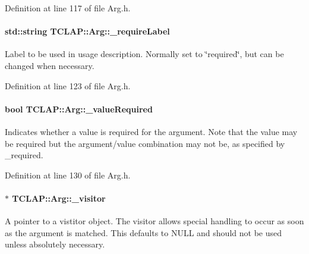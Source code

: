 Definition at line 117 of file Arg.\+h.

\paragraph[{\texorpdfstring{\+\_\+require\+Label}{_requireLabel}}]{\setlength{\rightskip}{0pt plus 5cm}std\+::string T\+C\+L\+A\+P\+::\+Arg\+::\+\_\+require\+Label\hspace{0.3cm}{\ttfamily [protected]}}\hypertarget{classTCLAP_1_1Arg_a2ed097a868e34a0c4f6062ead744ac54}{}\label{classTCLAP_1_1Arg_a2ed097a868e34a0c4f6062ead744ac54}
Label to be used in usage description. Normally set to \char`\"{}required\char`\"{}, but can be changed when necessary. 

Definition at line 123 of file Arg.\+h.

\paragraph[{\texorpdfstring{\+\_\+value\+Required}{_valueRequired}}]{\setlength{\rightskip}{0pt plus 5cm}bool T\+C\+L\+A\+P\+::\+Arg\+::\+\_\+value\+Required\hspace{0.3cm}{\ttfamily [protected]}}\hypertarget{classTCLAP_1_1Arg_a776682b7e19f4dc231bbad3d10034dfa}{}\label{classTCLAP_1_1Arg_a776682b7e19f4dc231bbad3d10034dfa}
Indicates whether a value is required for the argument. Note that the value may be required but the argument/value combination may not be, as specified by \+\_\+required. 

Definition at line 130 of file Arg.\+h.

\paragraph[{\texorpdfstring{\+\_\+visitor}{_visitor}}]{$\ast$ T\+C\+L\+A\+P\+::\+Arg\+::\+\_\+visitor\hspace{0.3cm}{\ttfamily [protected]}}\hypertarget{classTCLAP_1_1Arg_aa9ff037e92c9fa5bd85e532f61899300}{}\label{classTCLAP_1_1Arg_aa9ff037e92c9fa5bd85e532f61899300}
A pointer to a vistitor object. The visitor allows special handling to occur as soon as the argument is matched. This defaults to N\+U\+LL and should not be used unless absolutely necessary. 

